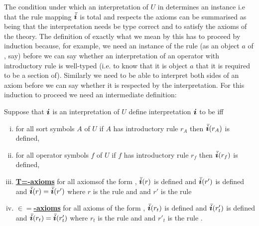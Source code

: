The condition under which an interpretation of $U$ in \catcw determines an instance i.e that the rule mapping $\Ibar$ is total and respects the axioms can be summarised as being that the interpretation needs be type correct and to satisfy the axioms of the theory. The definition of exactly what we mean by this has to proceed by induction because, for example, we need an instance of the rule
\ZDelta (as an object $a$ of \catc, say) before we can say whether an interpretation of an operator with introductory rule \genericfintroductoryrule
is well-typed (i.e. to know that it is object $a$ that it is required to be a section of).
Similarly we need to be able to interpret both sides of an axiom before we can say whether it is respected
by the interpretation. For this induction to proceed we need an intermediate definition:

\def\restrict{\mathbin{\restriction}}
\newcommand{\predInstance}{\overline{I \restrict U_p}}
\newcommand{\Uincrement}{U \setminus\kern-2pt U_p}

\begin{definition}
 Suppose that $\iI$ is an interpretation of $U$  
define interpretation $\iI$ to be   iff 

\begin{enumerate}[(i)]
\item
for all sort symbols $A$ of $U$ if $A$ has introductory rule $r_A$ then $\Ibar(r_A)$ is defined,
\item  
for all operator symbols $f$ of $U$ if $f$ has introductory rule $r_f$ then $\Ibar(r_f)$ is defined,

\item \underline{\textbf{T=-axioms}} 
for all axiomsof the form
 ,
$\Ibar(r)$ is defined and $\Ibar(r')$ is defined and
$\Ibar(r) = \Ibar(r')$ where $r$ is the rule
\ZDelta and  
and $r'$ is the rule \ZDeltap

\item \underline{\textbf{$\boldsymbol{\in=}$-axioms}} 
for all axioms  of the form
,
$\Ibar(r_t)$ is defined and  $\Ibar(r'_t)$ is defined and
$\Ibar(r_t) = \Ibar(r'_t)$ where $r_t$ is the rule
\ZtDelta and  
and $r'_t$ is the rule .
\end{enumerate}
\end{definition}

